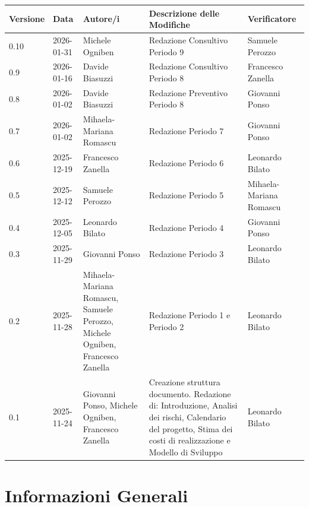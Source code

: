 \documentclass[a4paper, 11pt, oneside]{scrartcl} %
\begin{document}
\begin{center}
\renewcommand{\arraystretch}{1.2}
\begin{tabularx}{\textwidth}{@{}p{}p{}p{}X>{\centering\arraybackslash}p{}@{}}
\toprule
\textbf{Versione} & \textbf{Data} & \textbf{Autore/i} & \textbf{Descrizione delle Modifiche} & \textbf{Verificatore} \\
\midrule
0.10 & 2026-01-31 & Michele Ogniben & Redazione Consultivo Periodo 9 & Samuele Perozzo \\
0.9 & 2026-01-16 & Davide Biasuzzi & Redazione Consultivo Periodo 8 & Francesco Zanella \\
0.8 & 2026-01-02 & Davide Biasuzzi & Redazione Preventivo Periodo 8 & Giovanni Ponso \\
0.7 & 2026-01-02 & Mihaela-Mariana Romascu & Redazione Periodo 7 & Giovanni Ponso \\
0.6 & 2025-12-19 & Francesco Zanella & Redazione Periodo 6 & Leonardo Bilato \\
0.5 & 2025-12-12 & Samuele Perozzo & Redazione Periodo 5 & Mihaela-Mariana Romascu \\
0.4 & 2025-12-05 & Leonardo Bilato & Redazione Periodo 4 & Giovanni Ponso \\
0.3 & 2025-11-29 & Giovanni Ponso & Redazione Periodo 3 & Leonardo Bilato \\
0.2 & 2025-11-28 & Mihaela-Mariana Romascu, Samuele Perozzo, Michele Ogniben, Francesco Zanella & Redazione Periodo 1 e Periodo 2 & Leonardo Bilato \\
0.1 & 2025-11-24 & Giovanni Ponso, Michele Ogniben, Francesco Zanella & Creazione struttura documento. Redazione di: Introduzione, Analisi dei rischi, Calendario del progetto, Stima dei costi di realizzazione e Modello di Sviluppo & Leonardo Bilato \\
\bottomrule
\end{tabularx}
\end{center}

\newpage
\tableofcontents 
\pagestyle{fancy} 

\newpage
\section*{Informazioni Generali}
\end{document}
